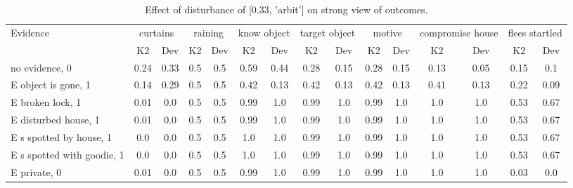 \begin{table}\begin{tabular}{l|cc|cc|cc|cc|cc|cc|cc}\toprule\multirow{2}{*}{Evidence} & \multicolumn{2}{c}{curtains}& \multicolumn{2}{c}{raining}& \multicolumn{2}{c}{know object}& \multicolumn{2}{c}{target object}& \multicolumn{2}{c}{motive}& \multicolumn{2}{c}{compromise house}& \multicolumn{2}{c}{flees startled}\\& {K2} & {Dev}& {K2} & {Dev}& {K2} & {Dev}& {K2} & {Dev}& {K2} & {Dev}& {K2} & {Dev}& {K2} & {Dev}\\\midrule
no evidence, 0 & \cellcolor{Bittersweet}0.24&\cellcolor{Bittersweet}0.33&0.5&0.5&\cellcolor{Bittersweet}0.59&\cellcolor{Bittersweet}0.44&\cellcolor{Bittersweet}0.28&\cellcolor{Bittersweet}0.15&\cellcolor{Bittersweet}0.28&\cellcolor{Bittersweet}0.15&\cellcolor{Bittersweet}0.13&\cellcolor{Bittersweet}0.05&0.15&0.1\\E object is gone, 1 & \cellcolor{Bittersweet}0.14&\cellcolor{Bittersweet}0.29&0.5&0.5&\cellcolor{Bittersweet}0.42&\cellcolor{Bittersweet}0.13&\cellcolor{Bittersweet}0.42&\cellcolor{Bittersweet}0.13&\cellcolor{Bittersweet}0.42&\cellcolor{Bittersweet}0.13&\cellcolor{Bittersweet}0.41&\cellcolor{Bittersweet}0.13&\cellcolor{Bittersweet}0.22&\cellcolor{Bittersweet}0.09\\E broken lock, 1 & 0.01&0.0&0.5&0.5&0.99&1.0&0.99&1.0&0.99&1.0&1.0&1.0&\cellcolor{Bittersweet}0.53&\cellcolor{Bittersweet}0.67\\E disturbed house, 1 & 0.01&0.0&0.5&0.5&0.99&1.0&0.99&1.0&0.99&1.0&1.0&1.0&\cellcolor{Bittersweet}0.53&\cellcolor{Bittersweet}0.67\\E s spotted by house, 1 & 0.0&0.0&0.5&0.5&1.0&1.0&0.99&1.0&0.99&1.0&1.0&1.0&\cellcolor{Bittersweet}0.53&\cellcolor{Bittersweet}0.67\\E s spotted with goodie, 1 & 0.0&0.0&0.5&0.5&1.0&1.0&0.99&1.0&0.99&1.0&1.0&1.0&\cellcolor{Bittersweet}0.53&\cellcolor{Bittersweet}0.67\\E private, 0 & 0.01&0.0&0.5&0.5&0.99&1.0&0.99&1.0&0.99&1.0&1.0&1.0&0.03&0.0\\\bottomrule\end{tabular}\caption{Effect of disturbance of [0.33, 'arbit'] on strong view of outcomes.}\end{table}
